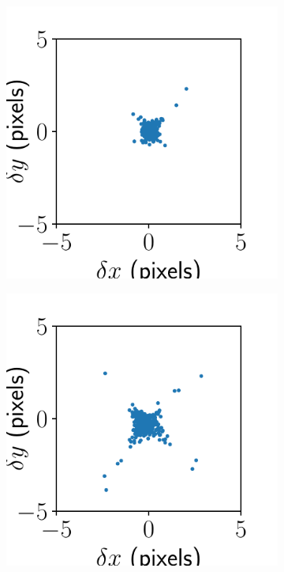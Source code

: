 \documentclass{article}
\begin{document}
\begin{figure}[ht]
\begin{subfigure}{0.24\linewidth}
		\caption{}
		\label{fig:stitchresultJHUPolaris3}
	\end{subfigure}
	\begin{subfigure}{0.24\linewidth}
		\includegraphics[width=\linewidth]{stitch-result-JHUPolaris-2.pdf}
		\caption{}
		\label{fig:stitchresultJHUPolaris2}
	\end{subfigure}
	\begin{subfigure}{0.24\linewidth}
		\includegraphics[width=\linewidth]{stitch-result-JHUPolaris-1.pdf}

\end{subfigure}
\end{figure}
\end{document}
